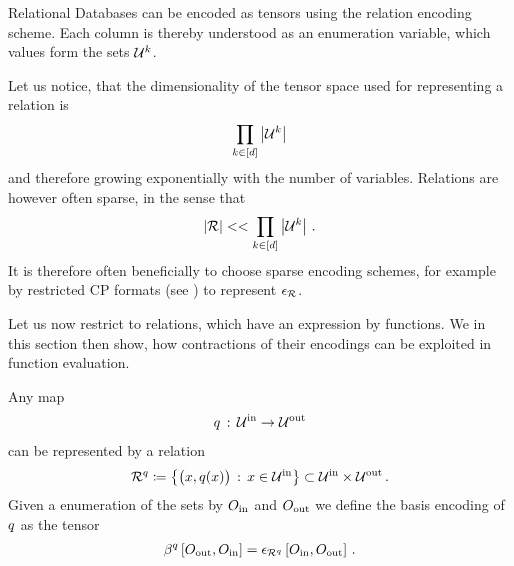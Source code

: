 \begin{example}
    Relational Databases can be encoded as tensors using the relation encoding scheme.
    Each column is thereby understood as an enumeration variable, which values form the sets $\mathcal{U}^{k}$.
\end{example}

Let us notice, that the dimensionality of the tensor space used for representing a relation is
\begin{align*}
    \prod_{k\in[d]} \left|\mathcal{U}^{k}\right|
\end{align*}
and therefore growing exponentially with the number of variables.
Relations are however often sparse, in the sense that
\begin{align*}
    \left|\mathcal{R}\right| << \prod_{k\in[d]} \left|\mathcal{U}^{k}\right| \, .
\end{align*}
It is therefore often beneficially to choose sparse encoding schemes, for example by restricted CP formats (see ) to represent $\epsilon_{\mathcal{R}}$.



Let us now restrict to relations, which have an expression by functions.
We in this section then show, how contractions of their encodings can be exploited in function evaluation.



\begin{definition}
    \label{def:functionRelationEncoding}
    Any map
    \begin{align*}
        q\,:\, \mathcal{U}^{\mathrm{in}} \rightarrow \mathcal{U}^{\mathrm{out}}
    \end{align*}
    can be represented by a relation
    \begin{align*}
        \mathcal{R}^{q} \coloneqq \left\{ \big(x,q(x)\big) \,:\, x \in\mathcal{U}^{\mathrm{in}} \right\} \subset \mathcal{U}^{\mathrm{in}} \times \mathcal{U}^{\mathrm{out}} \, .
    \end{align*}
    Given a enumeration of the sets by $O_{\mathrm{in}}$ and $O_{\mathrm{out}}$ we define the basis encoding of $q$ as the tensor
    \begin{align*}
        \beta^{q}\left[O_{\mathrm{out}},O_{\mathrm{in}}\right]
        = \epsilon_{\mathcal{R}^{q}}\left[O_{\mathrm{in}},O_{\mathrm{out}}\right]  \, .
    \end{align*}
\end{definition}

